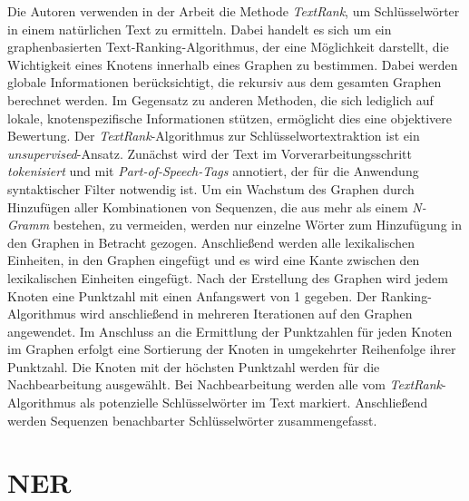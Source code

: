 Die Autoren \citeauthor{mihalcea2004textrank} verwenden in der Arbeit \cite{mihalcea2004textrank} die Methode \emph{TextRank}, um Schlüsselwörter in einem natürlichen Text zu ermitteln. Dabei handelt es sich um ein graphenbasierten Text-Ranking-Algorithmus, der eine Möglichkeit darstellt, die Wichtigkeit eines Knotens innerhalb eines Graphen zu bestimmen. Dabei werden globale Informationen berücksichtigt, die rekursiv aus dem gesamten Graphen berechnet werden. Im Gegensatz zu anderen Methoden, die sich lediglich auf lokale, knotenspezifische Informationen stützen, ermöglicht dies eine objektivere Bewertung. Der \emph{TextRank}-Algorithmus zur Schlüsselwortextraktion
ist ein \emph{unsupervised}-Ansatz. Zunächst wird der Text im Vorverarbeitungsschritt \emph{tokenisiert} und mit \emph{Part-of-Speech-Tags} annotiert, der für die Anwendung syntaktischer Filter notwendig ist. Um ein Wachstum des Graphen durch Hinzufügen aller Kombinationen von Sequenzen, die aus mehr als einem \emph{N-Gramm} bestehen, zu vermeiden, werden nur einzelne Wörter zum Hinzufügung in den Graphen in Betracht gezogen. Anschließend werden alle lexikalischen Einheiten, in den Graphen eingefügt und es wird eine Kante zwischen den lexikalischen Einheiten eingefügt. Nach der Erstellung des Graphen wird jedem Knoten eine Punktzahl mit einen Anfangswert von 1 gegeben. Der Ranking-Algorithmus wird anschließend in mehreren Iterationen auf den Graphen angewendet. Im Anschluss an die Ermittlung der Punktzahlen für jeden Knoten im Graphen erfolgt eine Sortierung der Knoten in umgekehrter Reihenfolge ihrer Punktzahl. Die Knoten mit der höchsten Punktzahl werden für die Nachbearbeitung ausgewählt. Bei Nachbearbeitung werden alle vom \emph{TextRank}-Algorithmus als potenzielle Schlüsselwörter im Text markiert. Anschließend werden Sequenzen benachbarter Schlüsselwörter zusammengefasst.\\

\section{NER}

